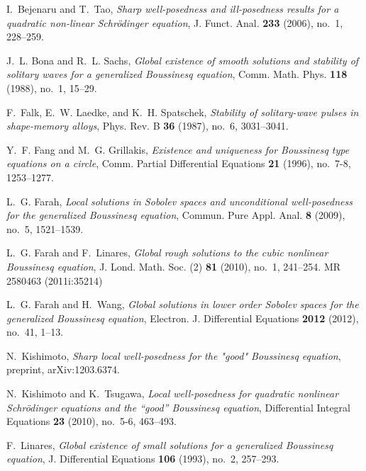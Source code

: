 \documentclass{amsart}
\begin{document}
\providecommand{\bysame}{\leavevmode\hbox to3em{\hrulefill}\thinspace}
\providecommand{\MR}{\relax\ifhmode\unskip\space\fi MR }
\providecommand{\MRhref}[2]{%
  \href{http://www.ams.org/mathscinet-getitem?mr=#1}{#2}
}
\providecommand{\href}[2]{#2}
\begin{thebibliography}{10}

I.~Bejenaru and T.~Tao, \emph{Sharp well-posedness and ill-posedness results
  for a quadratic non-linear {S}chr\"odinger equation}, J. Funct. Anal.
  \textbf{233} (2006), no.~1, 228--259.

J.~L. Bona and R.~L. Sachs, \emph{Global existence of smooth solutions and
  stability of solitary waves for a generalized {B}oussinesq equation}, Comm.
  Math. Phys. \textbf{118} (1988), no.~1, 15--29.

F.~Falk, E.~W. Laedke, and K.~H. Spatschek, \emph{Stability of solitary-wave
  pulses in shape-memory alloys}, Phys. Rev. B \textbf{36} (1987), no.~6,
  3031--3041.

Y.~F. Fang and M.~G. Grillakis, \emph{Existence and uniqueness for {B}oussinesq
  type equations on a circle}, Comm. Partial Differential Equations \textbf{21}
  (1996), no.~7-8, 1253--1277.

L.~G. Farah, \emph{Local solutions in {S}obolev spaces and unconditional
  well-posedness for the generalized {B}oussinesq equation}, Commun. Pure Appl.
  Anal. \textbf{8} (2009), no.~5, 1521--1539.

L.~G. Farah and F.~Linares, \emph{Global rough solutions to the cubic nonlinear
  {B}oussinesq equation}, J. Lond. Math. Soc. (2) \textbf{81} (2010), no.~1,
  241--254. \MR{2580463 (2011i:35214)}

L.~G. Farah and H.~Wang, \emph{Global solutions in lower order {S}obolev spaces
  for the generalized {B}oussinesq equation}, Electron. J. Differential
  Equations \textbf{2012} (2012), no.~41, 1--13.

N.~Kishimoto, \emph{Sharp local well-posedness for the "good" {B}oussinesq
  equation}, preprint, arXiv:1203.6374.

N.~Kishimoto and K.~Tsugawa, \emph{Local well-posedness for quadratic nonlinear
  {S}chr\"odinger equations and the ``good'' {B}oussinesq equation},
  Differential Integral Equations \textbf{23} (2010), no.~5-6, 463--493.

F.~Linares, \emph{Global existence of small solutions for a generalized
  {B}oussinesq equation}, J. Differential Equations \textbf{106} (1993), no.~2,
  257--293.


\end{thebibliography}
\end{document}
